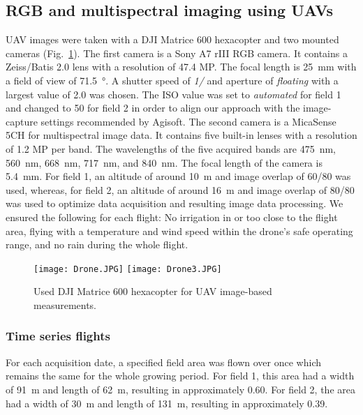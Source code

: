 \documentclass{article}
\def\figref#1{Fig.~\ref{#1}}
\begin{document}
\subsection{RGB and multispectral imaging using UAVs}
UAV images were taken with a DJI Matrice 600 hexacopter and two mounted cameras (\figref{fig:drone}).
The first camera is a Sony A7 rIII RGB camera. It contains a Zeiss/Batis 2.0 lens with a resolution of 47.4 MP. The focal length is \SI{25}{\milli\meter} with a field of view of \SI{71.5}{\degree}. A shutter speed of \emph{1/} and aperture of \emph{floating} with a largest value of 2.0 was chosen. The ISO value was set to \emph{automated} for field 1 and changed to 50 for field 2 in order to align our approach with the image-capture settings recommended by Agisoft. 
The second camera is a MicaSense 5CH for multispectral image data. It contains five built-in lenses with a resolution of 1.2 MP per band. The wavelengths of the five acquired bands are \SI{475}{\nano\meter}, \SI{560}{\nano\meter}, \SI{668}{\nano\meter}, \SI{717}{\nano\meter}, and \SI{840}{\nano\meter}. The focal length of the camera is \SI{5.4}{\milli\meter}. 
%
For field 1, an altitude of around \SI{10}{\meter} and image overlap of 60/80 was used, whereas, for field 2, an altitude of around \SI{16}{\meter} and image overlap of 80/80 was used to optimize data acquisition and resulting image data processing.
We ensured the following for each flight: No irrigation in or too close to the flight area, flying with a temperature and wind speed within the drone's safe operating range, and no rain during the whole flight.

\begin{figure}[t]
	\centering
    \texttt{[image: Drone.JPG]}
	\hspace{12pt}
    \texttt{[image: Drone3.JPG]}
	\caption{Used DJI Matrice 600 hexacopter for UAV image-based measurements.}
	\label{fig:drone}
\end{figure}


\subsubsection{Time series flights}
For each acquisition date, a specified field area was flown over once which remains the same for the whole growing period. For field 1, this area had a width of \SI{91}{\meter} and length of \SI{62}{\meter}, resulting in approximately \SI{0.60}{\ha}. For field 2, the area had a width of \SI{30}{\meter} and length of \SI{131}{\meter},
resulting in approximately \SI{0,39}{\ha}. 
\end{document}
